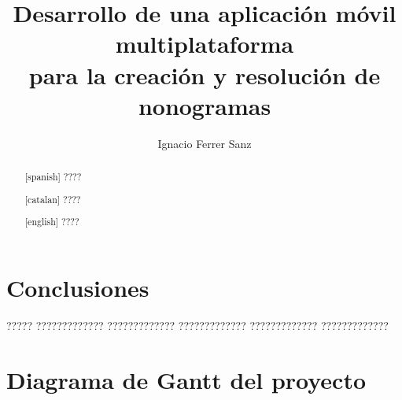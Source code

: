 \documentclass[11pt,spanish,listoffigures,listoftables]{tfgetsinf}
\title{Desarrollo de una aplicación móvil multiplataforma \\
para la creación y resolución de nonogramas}
\author{Ignacio Ferrer Sanz}
\begin{document}

\begin{abstract}[spanish]
????
\end{abstract}
\begin{abstract}[catalan]
   ????
\end{abstract}
\begin{abstract}[english]
????
\end{abstract}

\mainmatter









\chapter{Conclusiones}

????? ????????????? ????????????? ????????????? ????????????? ????????????? 









\cleardoublepage


\APPENDIX

\chapter{Diagrama de Gantt del proyecto}
\label{chap:A1}
\end{document}
